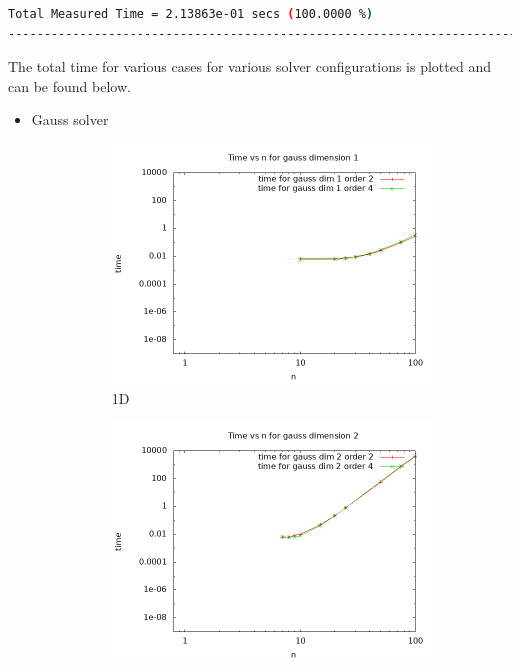 \documentclass[12 pt, final]{article}
\begin{document}
\begin{itemize}
\begin{lstlisting}[language=bash, basicstyle=\tiny]
                 Total Measured Time = 2.13863e-01 secs (100.0000 %)
------------------------------------------------------------------------------------------------------------
    \end{lstlisting}

The total time for various cases for various solver configurations is plotted and can be found below.

\begin{itemize}
    \item Gauss solver
            \begin{figure}[H]
        \centering
        \begin{subfigure}{.5\textwidth}
          \centering
          \includegraphics[width=.99\linewidth]{figures/time_gauss_dim1.png}
          \caption{1D}
          \label{fig:sub1}
        \end{subfigure}%
        \begin{subfigure}{.5\textwidth}
          \centering
          \includegraphics[width=.99\linewidth]{figures/time_gauss_dim2.png}

\end{subfigure}
\end{figure}
\end{itemize}
\end{itemize}
\end{document}
